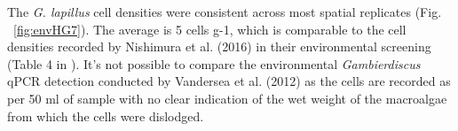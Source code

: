 \documentclass[12pt]{article}
\begin{document}
The \emph{G. lapillus} cell densities were consistent across most spatial replicates (Fig. ~\ref{fig:envHG7}). The average is 5 cells g-1, which is comparable to the cell densities recorded by Nishimura et al. (2016) in their environmental screening (Table 4 in \cite{nishimura2016quantitative}). It's not possible to compare the environmental \emph{Gambierdiscus} qPCR detection conducted by Vandersea et al. (2012) as the cells are recorded as per 50 ml of sample with no clear indication of the wet weight of the macroalgae from which the cells were dislodged. %
\end{document}
